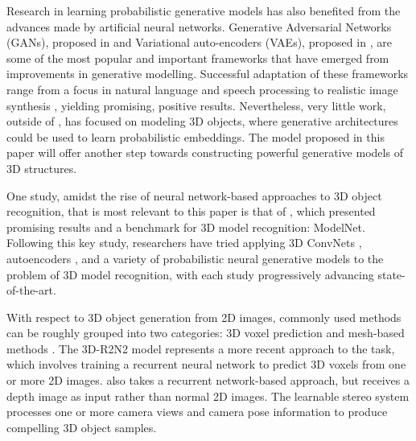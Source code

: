 \documentclass[10pt,twocolumn,letterpaper]{article}
\begin{document}
Research in learning probabilistic generative models has also benefited from the advances made by artificial neural networks.  Generative Adversarial Networks (GANs), proposed in \cite{goodfellow2014generative} and Variational auto-encoders (VAEs), proposed in \cite{kingma2013auto,rezende2014stochastic}, are some of the most popular and important frameworks that have emerged from improvements in generative modelling. Successful adaptation of these frameworks range from a focus in natural language and speech processing \cite{chung2015recurrent,serban2017piecewise} to realistic image synthesis \cite{gregor2015draw,radford2015unsupervised,pu2016variational}, yielding promising, positive results. Nevertheless, very little work, outside of \cite{wu2016learning,girdhar2016learning,rezende2016unsupervised}, has focused on modeling 3D objects, where generative architectures could be used to learn probabilistic embeddings. The model proposed in this paper will offer another step towards constructing powerful generative models of 3D structures.

One study, amidst the rise of neural network-based approaches to 3D object recognition, that is most relevant to this paper is that of \cite{wu20153d}, which presented promising results and a benchmark for 3D model recognition: ModelNet. Following this key study, researchers have tried applying 3D ConvNets \cite{maturana2015voxnet,choy20163d,su2015multi,yan2016perspective}, autoencoders \cite{xie2015deepshape,zhu2016deep,girdhar2016learning,rezende2016unsupervised}, and a variety of probabilistic neural generative models \cite{wu2016learning,rezende2016unsupervised} to the problem of 3D model recognition, with each study progressively advancing state-of-the-art.

With respect to 3D object generation from 2D images, commonly used methods can be roughly grouped into two categories: 3D voxel prediction \cite{wu20153d,wu2016learning,girdhar2016learning,rezende2016unsupervised,choy20163d,hane2017hierarchical} and mesh-based methods \cite{gargallo2007minimizing,delaunoy2008minimizing}. The 3D-R2N2 model \cite{choy20163d} represents a more recent approach to the task, which involves training a recurrent neural network to predict 3D voxels from one or more 2D images. \cite{rezende2016unsupervised} also takes a recurrent network-based approach, but receives a depth image as input rather than normal 2D images. The learnable stereo system \cite{kar2017learning} processes one or more camera views and camera pose information to produce compelling 3D object samples.
\end{document}
